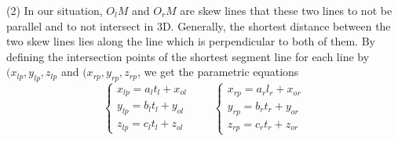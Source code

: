 
(2) In our situation, $O_lM$ and $O_rM$ are skew lines that these two lines to not be parallel and to not intersect in 3D. Generally, the shortest distance between the two skew lines lies along the line which is perpendicular to both of them. By defining the intersection points of the shortest segment line for each line by $(x_{lp}, y_{lp}, z_{lp}$ and $(x_{rp}, y_{rp}, z_{rp}$, we get the parametric equations
\begin{equation}  
	\left\{ 
	\begin{array}{lll} 
		x_{lp} = a_l t_l + x_{ol} \\
		y_{lp} = b_l t_l + y_{ol} \\
		z_{lp} = c_l t_l + z_{ol}
	\end{array} 
	\right.
	\qquad
		\left\{ 
	\begin{array}{lll} 
	x_{rp} = a_r l_r + x_{or} \\
	y_{rp} = b_r t_r + y_{or} \\
	z_{rp} = c_r t_r + z_{or}
	\end{array} 
	\right.
\end{equation}


